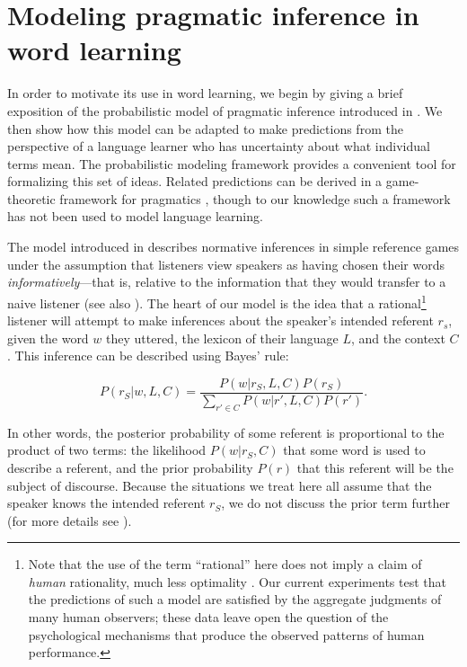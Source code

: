 \documentclass[review]{elsarticle}
\begin{document}
\section{Modeling pragmatic inference in word learning}


In order to motivate its use in word learning, we begin by giving a brief exposition of the probabilistic model of pragmatic inference introduced in \citet{frank2012}. We then show how this model can be adapted to make predictions from the perspective of a language learner who has uncertainty about what individual terms mean. The probabilistic modeling framework provides a convenient tool for formalizing this set of ideas. Related predictions can be derived in a game-theoretic framework for pragmatics \citep{benz2005,franke2009,jager2010,franke2013}, though to our knowledge such a framework has not been used to model language learning. 

The model introduced in \citet{frank2012} describes normative inferences in simple reference games under the assumption that listeners view speakers as having chosen their words \emph{informatively}---that is, relative to the information that they would transfer to a naive listener (see also \citealp{goodman2013}). The heart of our model is the idea that a rational\footnote{Note that the use of the term ``rational'' here does not imply a claim of \emph{human} rationality, much less optimality \citep{frank2013}. Our current experiments test that the predictions of such a model are satisfied by the aggregate judgments of many human observers; these data leave open the question of the psychological mechanisms that produce the observed patterns of human performance.} listener will attempt to make inferences about the speaker's intended referent $r_s$, given the word $w$ they uttered, the lexicon of their language $L$, and the context $C$. This inference can be described using Bayes' rule:

\begin{equation}
\label{eq:listener}
P(r_S | w, L, C) = \frac{P(w | r_S, L, C) P(r_S)}{\displaystyle \sum_{r' \in C}{P(w | r', L, C) P(r')}}.
\end{equation}

\noindent In other words, the posterior probability of some referent is proportional to the product of two terms: the likelihood $P(w|r_S,C)$ that some word is used to describe a referent, and the prior probability $P(r)$ that this referent will be the subject of discourse. Because the situations we treat here all assume that the speaker knows the intended referent $r_S$, we do not discuss the prior term further (for more details see \citealp{frank2012}). 
\end{document}
